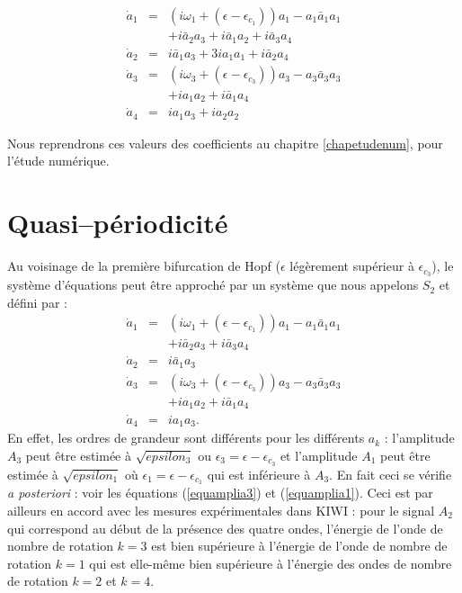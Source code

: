 \documentclass{book}
\begin{document}
\begin{eqnarray}
\dot{a}_1&=&(i\omega_1+(\epsilon-\epsilon_{c_1}))a_1-a_1\bar{a}_1a_1\nonumber\\
&&+i\bar{a}_2{a}_3+i\bar{a}_1a_2+i\bar{a}_3a_4\label{eqcoup1}\\
\dot{a}_2&=&i\bar{a}_1{a}_3+3ia_1a_1+i\bar{a}_2a_4\label{eqcoup2}\\
\dot{a}_3&=&(i\omega_3+(\epsilon-\epsilon_{c_3}))a_3-a_3\bar{a}_3a_3\nonumber\\
&&+i a_1a_2+i\bar{a}_1a_4\label{eqcoup3}\\
\dot{a}_4&=&ia_1a_3+ia_2a_2\label{eqcoup4}
\end{eqnarray}

Nous reprendrons ces valeurs des coefficients au chapitre
\ref{chapetudenum}, pour l'\'etude num\'erique.

\section{Quasi--p\'eriodicit\'e}
Au voisinage de la premi\`ere bifurcation de Hopf ($\epsilon$
l\'eg\`erement 
sup\'erieur \`a $\epsilon_{c_3}$), le syst\`eme d'\'equations peut
\^etre approch\'e par un syst\`eme que nous appelons $S_2$ et
d\'efini par :
\begin{eqnarray}
\dot{a}_1&=&(i\omega_1+(\epsilon-\epsilon_{c_1}))a_1-a_1\bar{a}_1a_1\nonumber\\
&&+i\bar{a}_2{a}_3+i\bar{a}_3a_4\label{eqa1quasip}\\
\dot{a}_2&=&i\bar{a}_1{a}_3\label{eqa2quasip}\\
\dot{a}_3&=&(i\omega_3+(\epsilon-\epsilon_{c_3}))a_3-a_3\bar{a}_3a_3\nonumber\\
&&+ia_1a_2+i\bar{a}_1a_4\label{eqa3quasip}\\
\dot{a}_4&=&ia_1a_3.\label{eqa4quasip}
\end{eqnarray}
En effet, les ordres de grandeur
sont
diff\'erents pour les diff\'erents $a_k$ :
l'amplitude $A_3$ peut \^etre estim\'ee \`a $\sqrt{epsilon_3}$
ou $\epsilon_3={\epsilon-\epsilon_{c_3}}$ et l'amplitude  
$A_1$ peut \^etre estim\'ee \`a $\sqrt{epsilon_1}$
o\`u $\epsilon_1={\epsilon-\epsilon_{c_1}}$ qui est 
inf\'erieure \`a $A_3$. En fait ceci se v\'erifie {\it  a posteriori} :
voir les \'equations   (\ref{equamplia3}) et (\ref{equamplia1}).
Ceci est par ailleurs en accord avec les mesures exp\'erimentales dans
KIWI : pour le signal $A_2$ qui correspond au d\'ebut de la pr\'esence
des quatre ondes, l'\'energie de l'onde de nombre de rotation $k=3$
est bien sup\'erieure \`a l'\'energie de l'onde de nombre de rotation
$k=1$ qui est elle-m\^eme bien sup\'erieure \`a l'\'energie des ondes
de nombre de rotation $k=2$ et $k=4$.
\end{document}
